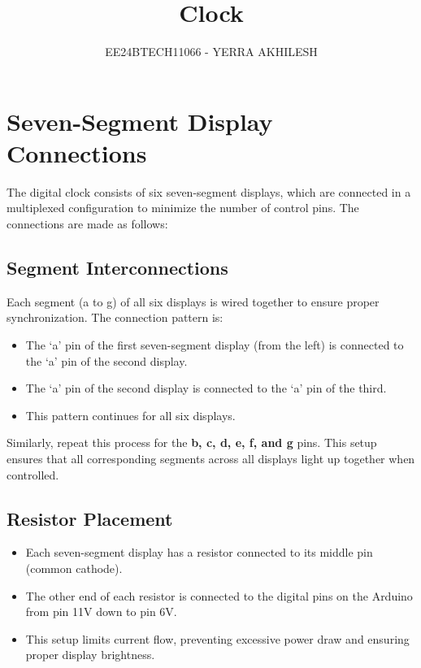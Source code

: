 \documentclass[journal]{IEEEtran}
\begin{document}

\vspace{3cm}

\title{Clock}
\author{EE24BTECH11066 - YERRA AKHILESH}
\maketitle

\renewcommand{\thefigure}{\theenumi}
\renewcommand{\thetable}{\theenumi}
\setlength{\intextsep}{10pt} %

\renewcommand{\thetable}{\theenumi}


\section{Seven-Segment Display Connections}

The digital clock consists of six seven-segment displays, which are connected in a multiplexed configuration to minimize the number of control pins. The connections are made as follows:

\subsection{Segment Interconnections}
Each segment (a to g) of all six displays is wired together to ensure proper synchronization. The connection pattern is:

\begin{itemize}
    \item The ‘a’ pin of the first seven-segment display (from the left) is connected to the ‘a’ pin of the second display.
    \item The ‘a’ pin of the second display is connected to the ‘a’ pin of the third.
    \item This pattern continues for all six displays.
\end{itemize}

Similarly, repeat this process for the \textbf{b, c, d, e, f, and g} pins.
This setup ensures that all corresponding segments across all displays light up together when controlled.

\subsection{Resistor Placement}

\begin{itemize}
    \item Each seven-segment display has a resistor connected to its middle pin (common cathode).
    \item The other end of each resistor is connected to the digital pins on the Arduino from pin 11V down to pin 6V.
    \item This setup limits current flow, preventing excessive power draw and ensuring proper display brightness.
\end{itemize}
\end{document}
